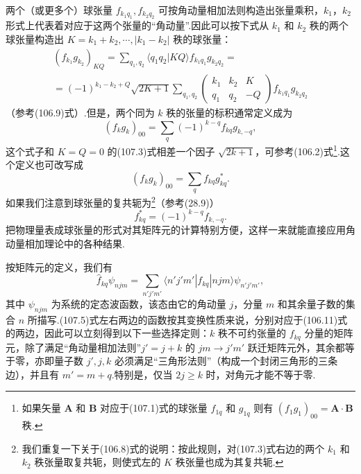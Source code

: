 两个（或更多个）球张量 $f_{k_1q_1},f_{k_2q_2}$ 可按角动量相加法则构造出张量乘积，$k_1$，$k_2$ 形式上代表着对应于这两个张量的“角动量”.因此可以按下式从 $k_1$ 和 $k_2$ 秩的两个球张量构造出 $K=k_1+k_2,\cdots,|k_1-k_2|$ 秩的球张量：
\begin{equation}
\begin{aligned}
  (f_{k_1}g_{k_2})_{KQ}=\sum_{q_1,q_2}\langle q_1q_2|KQ\rangle
  f_{k_1q_1}g_{k_2q_2}={}\\
  {}=(-1)^{k_1-k_2+Q}\sqrt{2K+1}\sum_{q_1,q_2}
  \left(\begin{array}{ccc}k_1&k_2&K\\q_1&q_2&-Q\end{array}\right)
  f_{k_1q_1}g_{k_2q_2}
\end{aligned}
\end{equation}
（参考(106.9)式）.但是，两个同为 $k$ 秩的张量的标积通常定义成为
\begin{equation}
  (f_kg_k)_{00}=\sum_q(-1)^{k-q}f_{kq}g_{k,-q},
\end{equation}
这个式子和 $K=Q=0$ 的(107.3)式相差一个因子 $\sqrt{2k+1}$，可参考(106.2)式\footnote{如果矢量 $\boldsymbol{A}$ 和 $\boldsymbol{B}$ 对应于(107.1)式的球张量 $f_{1q}$ 和 $g_{1q}$ 则有 $(f_1g_1)_{00}=\boldsymbol{A}\cdot\boldsymbol{B}$ 秩.}.这个定义也可改写成
\begin{equation*}
  (f_kg_k)_{00}=\sum_q f_{kq}g_{kq}^{*}.
\end{equation*}
如果我们注意到球张量的复共轭为\footnote{我们重复一下关于(106.8)式的说明：按此规则，对(107.3)式右边的两个 $k_1$ 和 $k_2$ 秩张量取复共轭，则使式左的 $K$ 秩张量也成为其复共轭.}（参考(28.9)）
\begin{equation*}
  f_{kq}^{*}=(-1)^{k-q}f_{k,-q}.
\end{equation*}
把物理量表成球张量的形式对其矩阵元的计算特别方便，这样一来就能直接应用角动量相加理论中的各种结果.

按矩阵元的定义，我们有
\begin{equation}
  \hat{f}_{kq}\psi_{njm}=\sum_{n'j'm'}
  \langle n'j'm'|f_{kq}|njm\rangle\psi_{n'j'm'},
\end{equation}
其中 $\psi_{njm}$ 为系统的定态波函数，该态由它的角动量 $j$，分量 $m$ 和其余量子数的集合 $n$ 所描写.(107.5)式左右两边的函数按其变换性质来说，分别对应于(106.11)式的两边，因此可以立刻得到以下一些选择定则：$k$ 秩不可约张量的 $f_{kq}$ 分量的矩阵元，除了满足“角动量相加法则”$j'=j+k$ 的 $jm\to j'm'$ 跃迁矩阵元外，其余都等于零，亦即量子数 $j',j,k$ 必须满足“三角形法则”（构成一个封闭三角形的三条边），并且有 $m'=m+q$.特别是，仅当 $2j\geqslant k$ 时，对角元才能不等于零.

